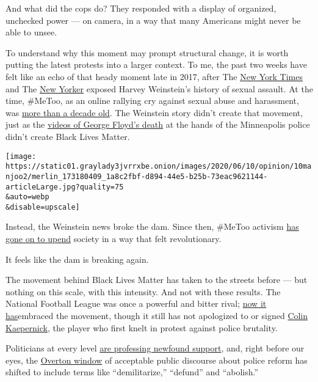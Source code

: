 And what did the cops do? They responded with a display of organized,
unchecked power --- on camera, in a way that many Americans might never
be able to unsee.

To understand why this moment may prompt structural change, it is worth
putting the latest protests into a larger context. To me, the past two
weeks have felt like an echo of that heady moment late in 2017, after
The
\href{https://www.nytimes3xbfgragh.onion/2017/10/05/us/harvey-weinstein-harassment-allegations.html}{New
York Times} and The
\href{https://www.newyorker.com/news/news-desk/from-aggressive-overtures-to-sexual-assault-harvey-weinsteins-accusers-tell-their-stories}{New
Yorker} exposed Harvey Weinstein's history of sexual assault. At the
time, \#MeToo, as an online rallying cry against sexual abuse and
harassment, was
\href{https://www.ajc.com/news/world/who-tarana-burke-meet-the-woman-who-started-the-too-movement-decade-ago/i8NEiuFHKaIvBh9ucukidK/}{more
than a decade old}. The Weinstein story didn't create that movement,
just as the
\href{https://www.nytimes3xbfgragh.onion/video/us/100000007159353/george-floyd-arrest-death-video.html}{videos
of George Floyd's death} at the hands of the Minneapolis police didn't
create Black Lives Matter.

\texttt{[image: https://static01.graylady3jvrrxbe.onion/images/2020/06/10/opinion/10manjoo2/merlin\_173180409\_1a8c2fbf-d894-44e5-b25b-73eac9621144-articleLarge.jpg?quality=75\\\&auto=webp\\\&disable=upscale]}

Instead, the Weinstein news broke the dam. Since then, \#MeToo activism
\href{https://www.nbcnews.com/storyline/sexual-misconduct/weinstein-here-s-growing-list-men-accused-sexual-misconduct-n816546}{has
gone on to upend} society in a way that felt revolutionary.

It feels like the dam is breaking again.

The movement behind Black Lives Matter has taken to the streets before
--- but nothing on this scale, with this intensity. And not with these
results. The National Football League was once a powerful and bitter
rival;
\href{https://sports.yahoo.com/the-nf-ls-black-lives-matter-statement-was-years-in-the-making-013616877.html}{now
it has}embraced the movement, though it still has not apologized to or
signed
\href{https://www.nytimes3xbfgragh.onion/2020/06/05/sports/football/george-floyd-kaepernick-kneeling-nfl-protests.html}{Colin
Kaepernick}, the player who first knelt in protest against police
brutality.

Politicians at every level
\href{https://www.theatlantic.com/politics/archive/2020/06/mitt-romney-black-lives-matter/612808/}{are
professing newfound support}, and, right before our eyes, the
\href{https://www.nytimes3xbfgragh.onion/2019/02/26/us/politics/overton-window-democrats.html}{Overton
window} of acceptable public discourse about police reform has shifted
to include terms like ``demilitarize,'' ``defund'' and ``abolish.''

